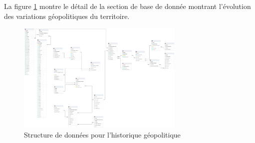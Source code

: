     La figure \ref{fig:offstreet_db_erd_history} montre le détail de la section de base de donnée montrant l'évolution des variations géopolitiques du territoire.
    \begin{figure}
        \centering
        \includegraphics[trim={18cm 40cm 60cm 12cm}, clip, width=8cm]{images/structure_base_de_donnee.png}
        \caption{Structure de données pour l'historique géopolitique}\label{fig:offstreet_db_erd_history}
    \end{figure}
    \FloatBarrier
    
